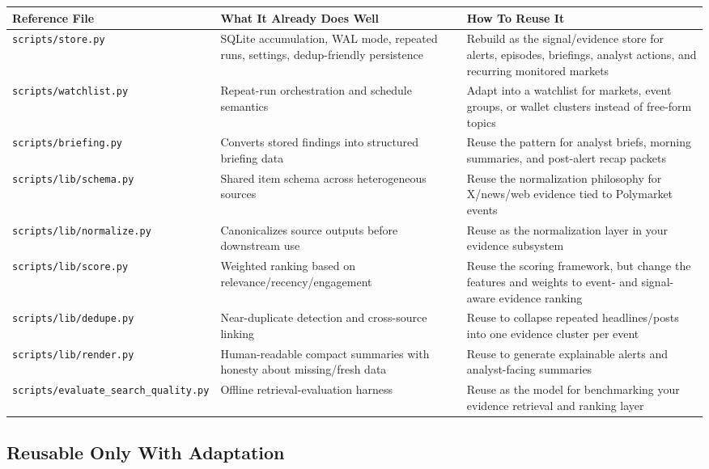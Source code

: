 \documentclass[11pt, letterpaper]{article}
\begin{document}
\begin{longtable}{p{3.6cm}p{5.0cm}p{5.0cm}}
\toprule
\textbf{Reference File} & \textbf{What It Already Does Well} & \textbf{How To Reuse It} \\
\midrule
\endhead
\texttt{scripts/store.py} & SQLite accumulation, WAL mode, repeated runs, settings, dedup-friendly persistence & Rebuild as the signal/evidence store for alerts, episodes, briefings, analyst actions, and recurring monitored markets \\
\texttt{scripts/watchlist.py} & Repeat-run orchestration and schedule semantics & Adapt into a watchlist for markets, event groups, or wallet clusters instead of free-form topics \\
\texttt{scripts/briefing.py} & Converts stored findings into structured briefing data & Reuse the pattern for analyst briefs, morning summaries, and post-alert recap packets \\
\texttt{scripts/lib/schema.py} & Shared item schema across heterogeneous sources & Reuse the normalization philosophy for X/news/web evidence tied to Polymarket events \\
\texttt{scripts/lib/normalize.py} & Canonicalizes source outputs before downstream use & Reuse as the normalization layer in your evidence subsystem \\
\texttt{scripts/lib/score.py} & Weighted ranking based on relevance/recency/engagement & Reuse the scoring framework, but change the features and weights to event- and signal-aware evidence ranking \\
\texttt{scripts/lib/dedupe.py} & Near-duplicate detection and cross-source linking & Reuse to collapse repeated headlines/posts into one evidence cluster per event \\
\texttt{scripts/lib/render.py} & Human-readable compact summaries with honesty about missing/fresh data & Reuse to generate explainable alerts and analyst-facing summaries \\
\texttt{scripts/evaluate\_search\_quality.py} & Offline retrieval-evaluation harness & Reuse as the model for benchmarking your evidence retrieval and ranking layer \\
\bottomrule
\end{longtable}

\subsection{Reusable Only With Adaptation}
\end{document}
